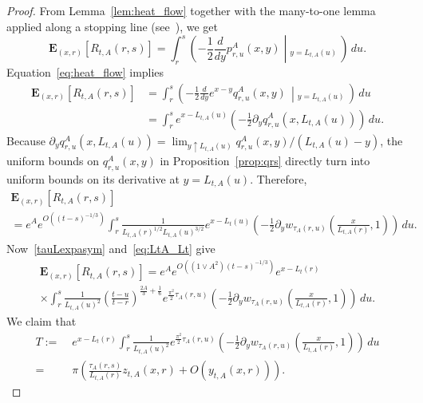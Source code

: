 \documentclass[10pt]{amsart}
\theoremstyle{definition}\newtheorem{defi}[theo]{Definition}\newtheorem{rema}[theo]{Remark}\newtheorem{exam}[theo]{Example}\newtheorem{exem}[theo]{Example}\newtheorem{nota}[theo]{Notation}
\newcommand*\E{\mathbf{E}}
\newcommand{\1} {\mathds{1}}
\begin{document}
\begin{proof}
From Lemma~\ref{lem:heat_flow} together with the many-to-one lemma applied along a stopping line (see~\cite[Sections~3.2 and~3.3]{thesis}), we get
\begin{equation}\label{eq:heat_flow}
\E_{(x,r)}\left[R_{t,A}(r,s)\right] =\int_r^s \left(-\frac 1 2 \frac{d}{dy}p^A_{r,u}(x,y)\middle|_{y=L_{t,A}(u)}\,\right)\,du.
\end{equation}
Equation~\eqref{eq:heat_flow} implies
\begin{align*}
\E_{(x,r)}\left[R_{t,A}(r,s)\right] &=\int_r^s \left(-\frac 1 2 \frac{d}{dy}e^{x-y}q^A_{r,u}(x,y)\,\middle|_{y=L_{t,A}(u)}\,\right)\,du\\
&= \int_r^s e^{x-L_{t,A}(u)}\left(-\frac 1 2 \partial_y q^A_{r,u}\left(x,L_{t,A}(u)\right)\right)\,du.
\end{align*}
Because $\partial_y q^A_{r,u}(x,L_{t,A}(u)) = \lim_{y\uparrow L_{t,A}(u)} q^A_{r,u}(x,y)/(L_{t,A}(u)-y)$, the uniform bounds on $q^A_{r,u}(x,y)$ in Proposition~\ref{prop:qrs} directly turn into uniform bounds on its derivative at $y=L_{t,A}(u)$. Therefore,
\begin{multline*}
\E_{(x,r)}\left[R_{t,A}(r,s)\right] \\
= e^A e^{O\left((t - s)^{-1/3}\right)} \int_r^s \frac{1}{L_{t,A}(r)^{1/2}L_{t,A}(u)^{3/2}} e^{x-L_t(u)} \left(-\frac 1 2 \partial_y w_{\tau_A(r,u)} \left(\frac{x}{L_{t,A}(r)}, 1 \right)\right)\,du.
\end{multline*}
Now~\eqref{tauLexpasym} and~\eqref{eq:LtA_Lt} give
\begin{multline}\label{Rexpeqtoshow1}
\E_{(x,r)}\left[R_{t,A}(r,s)\right] = e^A e^{O\left(\left(1 \vee A^2\right)(t - s)^{-1/3}\right)} e^{x-L_t(r)} \\
\times \int_r^s \frac{1}{L_{t,A}(u)^2} \left(\frac{t-u}{t-r} \right)^{\frac{2A} 3 + \frac 1 6} e^{\frac{\pi^2}2\tau_A(r,u)} \left(-\frac 1 2 \partial_y w_{\tau_A(r,u)} \left(\frac{x}{L_{t,A}(r)}, 1 \right)\right)\,du.
\end{multline}
We claim that
\begin{equation}\label{Rexpeqtoshow}
\begin{split}
T := &\; e^{x-L_t(r)}\int_r^s \frac{1}{L_{t,A}(u)^2} e^{\frac{\pi^2}2\tau_A(r,u)} \left(-\frac 1 2 \partial_y w_{\tau_A(r,u)} \left(\frac{x}{L_{t,A}(r)}, 1 \right)\right)\,du \\
= & \;\pi \left(\frac{\tau_A(r,s)}{L_{t,A}(r)} z_{t,A}(x,r) + O(y_{t,A}(x,r))\right).
\end{split}
\end{equation}

\end{proof}
\end{document}
